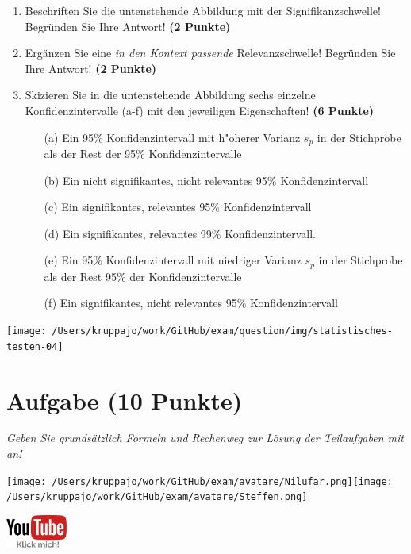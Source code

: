 \documentclass[a4paper, 9pt]{scrartcl}\usepackage[]{graphicx}\usepackage[]{xcolor}
\begin{document}
\begin{enumerate}
\item Beschriften Sie die untenstehende Abbildung mit der Signifikanzschwelle! Begründen Sie Ihre Antwort! \textbf{(2 Punkte)}
\item Ergänzen Sie eine \textit{in den Kontext passende} Relevanzschwelle! Begründen Sie Ihre Antwort! \textbf{(2 Punkte)} 
\item Skizieren Sie in die untenstehende Abbildung sechs einzelne Konfidenzintervalle (a-f) mit den
  jeweiligen Eigenschaften! \textbf{(6 Punkte)}
  \begin{itemize}
  \item[(a)] Ein 95\% Konfidenzintervall mit h{"o}herer Varianz $s_p$ in der Stichprobe als der Rest der 95\% Konfidenzintervalle 	
  \item[(b)] Ein nicht signifikantes, nicht relevantes 95\% Konfidenzintervall 	
  \item[(c)] Ein signifikantes, relevantes 95\% Konfidenzintervall 	
  \item[(d)] Ein signifikantes, relevantes 99\% Konfidenzintervall. 
  \item[(e)] Ein 95\% Konfidenzintervall mit niedriger Varianz $s_p$ in der Stichprobe als der Rest 95\% der Konfidenzintervalle
  \item[(f)] Ein signifikantes, nicht relevantes 95\% Konfidenzintervall
  \end{itemize}
\end{enumerate}

\begin{center}
  \texttt{[image: /Users/kruppajo/work/GitHub/exam/question/img/statistisches-testen-04]}
\end{center}


 
\clearpage

\section{Aufgabe \hfill (10 Punkte)}

\textit{Geben Sie grundsätzlich Formeln und Rechenweg zur Lösung der Teilaufgaben mit an!} \\[1Ex]


 
\begin{minipage}[t]{0.5\textwidth}
\texttt{[image: /Users/kruppajo/work/GitHub/exam/avatare/Nilufar.png]}\hspace{-4mm}\texttt{[image: /Users/kruppajo/work/GitHub/exam/avatare/Steffen.png]}
\end{minipage}
\begin{minipage}[t]{0.5\textwidth}
\hfill
\href{https://youtu.be/FgZmpnEWDag}{\includegraphics[width = 2cm]{img/youtube}}
\end{minipage}
\end{document}

